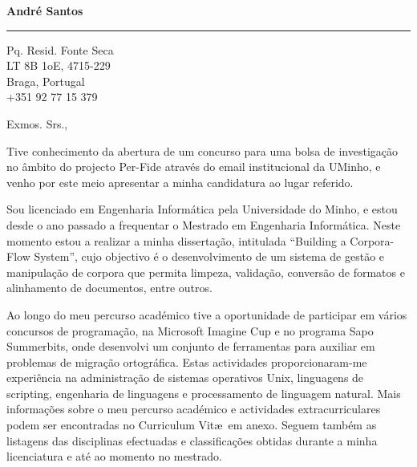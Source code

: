 \documentclass{letter} %
\begin{document}
\signature{André Santos}           %
\longindentation=0pt                       %
\let\raggedleft\raggedright                %
 
 
\begin{letter}{}


\begin{flushleft}
{\large\bf André Santos}
\end{flushleft}
\medskip\hrule height 1pt
\begin{flushright}
\hfill Pq. Resid. Fonte Seca \\
\hfill LT 8B 1oE, 4715-229 \\
\hfill Braga, Portugal \\
\hfill +351 92 77 15 379
\end{flushright} 
\vfill %

 
\opening{Exmos. Srs.,} 
 
\noindent Tive conhecimento da abertura de um concurso para uma bolsa 
de investigação no âmbito do projecto Per-Fide através do email 
institucional da UMinho, e venho por este meio apresentar a minha 
candidatura ao lugar referido.
 
\noindent Sou licenciado em Engenharia Informática pela
Universidade do Minho, e estou desde o ano passado a frequentar
o Mestrado em Engenharia Informática. Neste momento estou a
realizar a minha dissertação, intitulada ``Building a Corpora-Flow
System'', cujo objectivo é o desenvolvimento de um sistema de gestão
e manipulação de corpora que permita limpeza, validação, conversão 
de formatos e alinhamento de documentos, entre outros.

\noindent Ao longo do meu percurso académico tive a 
oportunidade de participar em vários concursos de programação, 
na Microsoft Imagine Cup e no programa Sapo Summerbits, onde 
desenvolvi um conjunto de ferramentas para auxiliar em problemas de 
migração ortográfica. Estas actividades proporcionaram-me 
experiência na administração de sistemas operativos Unix, linguagens
de scripting, engenharia de linguagens e processamento de linguagem
natural. Mais informações sobre o meu percurso académico e actividades 
extracurriculares podem ser encontradas no Curriculum Vit\ae~em anexo. 
Seguem também
as listagens das disciplinas efectuadas e classificações obtidas
durante a minha licenciatura e até ao momento no mestrado.


\end{letter}
\end{document}

